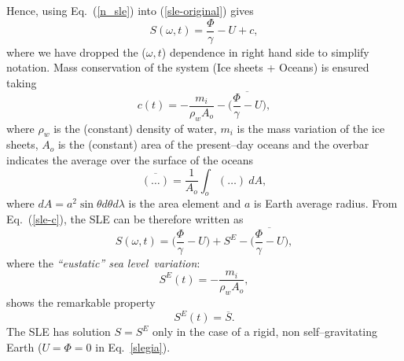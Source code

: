\documentclass[11pt,fleqn,a4paper,titlepage]{article}
\newcommand\sealevel{sea level~}
\begin{document}
Hence, using Eq.~(\ref{n_sle}) into (\ref{sle-original}) gives 
\begin{equation}\label{sle-c}
S(\omega, t) = \frac{\Phi}{\gamma} - U +c, 
\end{equation}
where we have dropped the ($\omega,t$) dependence in right hand side to simplify notation. Mass
conservation of the system (Ice sheets + Oceans) is ensured taking   
\begin{equation}\label{c-constant}
c(t) = - \frac{m_i}{\rho_{w}A_{o}} - \overline{ \biggl( \frac{\Phi}{\gamma} - U\biggr)}, 
\end{equation}
where $\rho_{w}$ is the (constant) density of water, $m_{i}$ is the mass 
variation of the ice sheets, $A_{o}$ is the (constant) area of the present--day oceans 
and the overbar indicates the average over the surface of the oceans 
\begin{equation}\label{average}
\overline {(\ldots)} = \frac{1}{A_{o}} \int_{o} (\ldots) ~dA,
\end{equation}
where $dA=a^{2}\sin\theta d\theta d\lambda$ is the area element 
and $a$ is Earth average radius. From Eq.~(\ref{sle-c}), the SLE can be therefore written as 
\begin{equation}\label{slegia}
S(\omega,t) = \biggl( \frac{\Phi}{\gamma} - U\biggr)  +S^E   - \overline{ \biggl( \frac{\Phi}{\gamma} - U\biggr)}, 
\end{equation}
where the \emph{``eustatic'' \sealevel variation}: 
\begin{equation}\label{eustatic}
S^{E}(t) = - \frac{m_i}{\rho_w A_o},  
\end{equation}
shows the remarkable property 
\begin{equation}
S^{E}(t) = \overline{S}. 
\end{equation}
\noindent The SLE has solution $S=S^{E}$ only in the case of a rigid, 
non self--gravitating Earth ($U = \Phi = 0$ in Eq.~\ref{slegia}).
\end{document}
